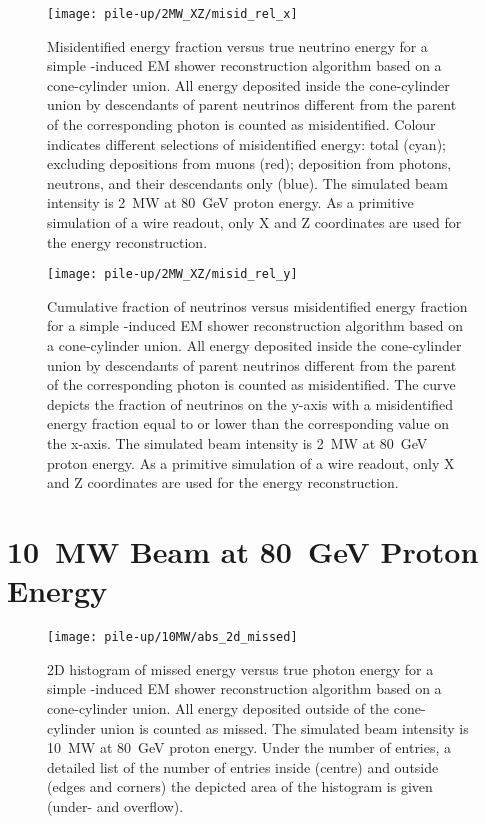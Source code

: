 \begin{figure}[htb]
	\centering
	\texttt{[image: pile-up/2MW\_XZ/misid\_rel\_x]}
	\caption{Misidentified energy fraction versus true neutrino energy for a simple \Pgpz-induced EM shower reconstruction algorithm based on a cone-cylinder union.
		All energy deposited inside the cone-cylinder union by descendants of parent neutrinos different from the parent of the corresponding \Pgpz photon is counted as misidentified.
		Colour indicates different selections of misidentified energy: total (cyan); excluding depositions from muons (red); deposition from photons, neutrons, and their descendants only (blue).
		The simulated beam intensity is \SI{2}{\mega\watt} at \SI{80}{\giga\electronvolt} proton energy.
		As a primitive simulation of a wire readout, only X and Z coordinates are used for the energy reconstruction.}
\end{figure}

\begin{figure}[htb]
	\centering
	\texttt{[image: pile-up/2MW\_XZ/misid\_rel\_y]}
	\caption{Cumulative fraction of neutrinos versus misidentified energy fraction for a simple \Pgpz-induced EM shower reconstruction algorithm based on a cone-cylinder union.
		All energy deposited inside the cone-cylinder union by descendants of parent neutrinos different from the parent of the corresponding \Pgpz photon is counted as misidentified.
		The curve depicts the fraction of neutrinos on the y-axis with a misidentified energy fraction equal to or lower than the corresponding value on the x-axis.
		The simulated beam intensity is \SI{2}{\mega\watt} at \SI{80}{\giga\electronvolt} proton energy.
		As a primitive simulation of a wire readout, only X and Z coordinates are used for the energy reconstruction.}
\end{figure}


\section{\SI{10}{\mega\watt} Beam at \SI{80}{\giga\electronvolt} Proton Energy}

\begin{figure}[htb]
	\centering
	\texttt{[image: pile-up/10MW/abs\_2d\_missed]}
	\caption{2D histogram of missed energy versus true photon energy for a simple \Pgpz-induced EM shower reconstruction algorithm based on a cone-cylinder union.
		All energy deposited outside of the cone-cylinder union is counted as missed.
		The simulated beam intensity is \SI{10}{\mega\watt} at \SI{80}{\giga\electronvolt} proton energy.
		Under the number of entries, a detailed list of the number of entries inside (centre) and outside (edges and corners) the depicted area of the histogram is given (under- and overflow).}
\end{figure}

